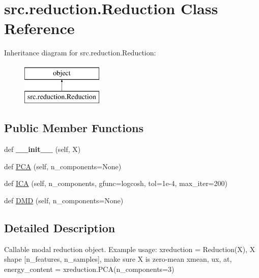 \hypertarget{classsrc_1_1reduction_1_1Reduction}{}\section{src.\+reduction.\+Reduction Class Reference}
\label{classsrc_1_1reduction_1_1Reduction}
Inheritance diagram for src.\+reduction.\+Reduction\+:\begin{figure}[H]
\begin{center}
\leavevmode
\includegraphics[height=2.000000cm]{classsrc_1_1reduction_1_1Reduction}
\end{center}
\end{figure}
\subsection*{Public Member Functions}
\begin{DoxyCompactItemize}
\item 
\mbox{\label{classsrc_1_1reduction_1_1Reduction_ab7ff5ded32de74d8ac34302ecc9b0b71}} 
def {\bfseries \+\_\+\+\_\+init\+\_\+\+\_\+} (self, X)
\item 
def \hyperlink{classsrc_1_1reduction_1_1Reduction_ac81be4ff2c47e70a5f0af081af6faff6}{P\+CA} (self, n\+\_\+components=None)
\item 
def \hyperlink{classsrc_1_1reduction_1_1Reduction_aeae4617e67a22994d2e8432eba840cde}{I\+CA} (self, n\+\_\+components, gfunc=\textquotesingle{}logcosh\textquotesingle{}, tol=1e-\/4, max\+\_\+iter=200)
\item 
def \hyperlink{classsrc_1_1reduction_1_1Reduction_a4caf2d9ebcae694c40cd1a53b839dbea}{D\+MD} (self, n\+\_\+components=None)
\end{DoxyCompactItemize}


\subsection{Detailed Description}
\begin{DoxyVerb}Callable modal reduction object.
Example usage:
xreduction = Reduction(X), X shape [n_features, n_samples], make sure X is 
zero-mean
xmean, ux, at, energy_content = xreduction.PCA(n_components=3)
\end{DoxyVerb}
 

